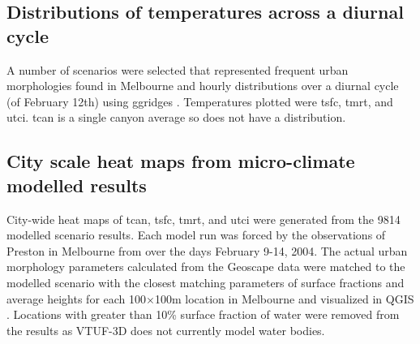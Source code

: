 \documentclass[final,3p,times,authoryear]{elsarticle}
\begin{document}
\subsection{Distributions of temperatures across a diurnal cycle}\label{sec:methodsdist}
%
% 

A number of scenarios were selected that represented frequent urban morphologies found in Melbourne and hourly distributions over a diurnal cycle (of February 12th) using ggridges \citep{ggridges}. Temperatures plotted were \gls{tsfc}, \gls{tmrt}, and \gls{utci}. \gls{tcan} is a single canyon average so does not have a distribution.


\subsection{City scale heat maps from micro-climate modelled results}\label{sec:methodsheatmaps}

City-wide heat maps of \gls{tcan}, \gls{tsfc}, \gls{tmrt}, and \gls{utci} were generated from the 9814 modelled scenario results. Each model run was forced by the observations of Preston in Melbourne from \cite{Coutts2007} over the days February 9-14, 2004. The actual urban morphology parameters calculated from the Geoscape data were matched to the modelled scenario with the closest matching parameters of surface fractions and average heights for each 100$\times$100m location in Melbourne and visualized in QGIS \citep{QGIS2009}. Locations with greater than 10\% surface fraction of water were removed from the results as VTUF-3D does not currently model water bodies.
\end{document}
